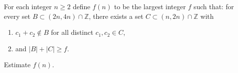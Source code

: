 For each integer $n\ge 2$ define $f(n)$ to be the largest integer $f$ such that:
for every set $B\subset (2n,4n)\cap\mathbb{Z}$, there exists a set $C\subset (n,2n)\cap\mathbb{Z}$ with
\begin{enumerate}[leftmargin=2em]
\item $c_1+c_2\notin B$ for all distinct $c_1,c_2\in C$,
\item and $|B|+|C|\ge f$.
\end{enumerate}
Estimate $f(n)$.
